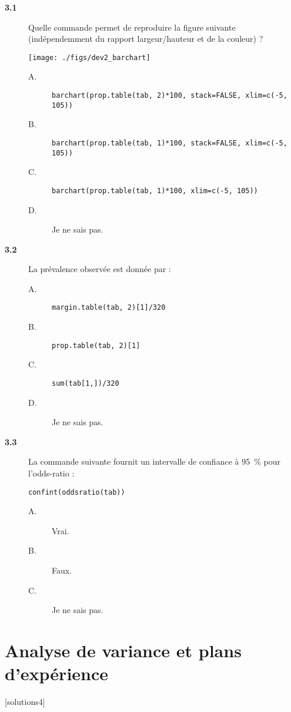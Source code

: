 \documentclass[11pt]{report}
\theoremstyle{definition}
\begin{document}
\begin{description}
\item[\bf 3.1]  Quelle commande permet de
  reproduire la figure suivante (indépendemment du rapport largeur/hauteur
  et de la couleur) ?
\begin{center}
  \texttt{[image: ./figs/dev2\_barchart]}
\end{center}
\begin{description}
\item[A.] \verb|barchart(prop.table(tab, 2)*100, stack=FALSE, xlim=c(-5, 105))|
\item[B.] \verb|barchart(prop.table(tab, 1)*100, stack=FALSE, xlim=c(-5, 105))|
\item[C.] \verb|barchart(prop.table(tab, 1)*100, xlim=c(-5, 105))|
\item[D.] Je ne sais pas.
\end{description}
\item[\bf 3.2]  La prévalence observée est donnée par : 
\begin{description}
\item[A.] \verb|margin.table(tab, 2)[1]/320|
\item[B.] \verb|prop.table(tab, 2)[1]|
\item[C.] \verb|sum(tab[1,])/320|
\item[D.] Je ne sais pas.
\end{description}
\item[\bf 3.3]  La commande suivante fournit un
  intervalle de confiance à 95~\% pour 
l'odds-ratio : 
\begin{verbatim}
confint(oddsratio(tab))
\end{verbatim}
\begin{description}
\item[A.] Vrai.
\item[B.] Faux.
\item[C.] Je ne sais pas.
\end{description}
\end{description}


\chapter{Analyse de variance et plans d'expérience}\label{chap:anova}
[solutions4]
\end{document}
